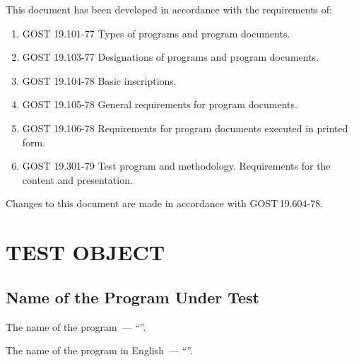 \documentclass[12pt,a4paper]{extarticle}
\begin{document}
\clearpage

\noindent
This document has been developed in accordance with the requirements of:

\begin{enumerate}[label=\arabic*), leftmargin=1.25cm]
\item GOST 19.101-77 Types of programs and program documents\cite{gost19101}.
\item GOST 19.103-77 Designations of programs and program documents\cite{gost19103}.
\item GOST 19.104-78 Basic inscriptions\cite{gost19104}.
\item GOST 19.105-78 General requirements for program documents\cite{gost19105}.
\item GOST 19.106-78 Requirements for program documents executed
      in printed form\cite{gost19106}.
\item GOST 19.301-79 Test program and methodology. Requirements
      for the content and presentation\cite{gost19301}.
\end{enumerate}

Changes to this document are made in accordance with GOST\,19.604-78\cite{gost19604}.

\clearpage

\hypersetup{linkcolor=black}
\tableofcontents
\hypersetup{linkcolor=blue}
\thispagestyle{fancy}
\clearpage

\section{TEST OBJECT}

\subsection{Name of the Program Under Test}

The name of the program~--- \enquote{\projectname}.

The name of the program in English~--- \enquote{\hseProjectNameEn}.
\end{document}
